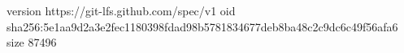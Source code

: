 version https://git-lfs.github.com/spec/v1
oid sha256:5e1aa9d2a3e2fec1180398fdad98b5781834677deb8ba48c2c9dc6c49f56afa6
size 87496
